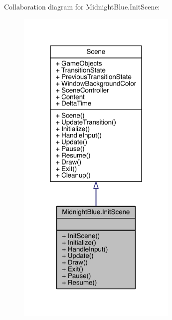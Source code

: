 Collaboration diagram for Midnight\+Blue.\+Init\+Scene\+:
\nopagebreak
\begin{figure}[H]
\begin{center}
\leavevmode
\includegraphics[width=217pt]{class_midnight_blue_1_1_init_scene__coll__graph}
\end{center}
\end{figure}
